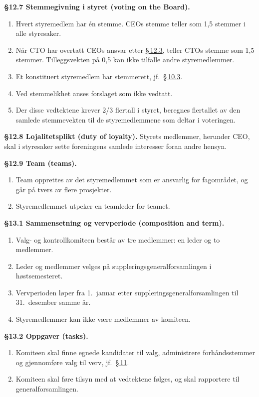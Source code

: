 \documentclass{../../../Common/Latex/Templates/rapport}
\begin{document}
\textbf{\S 12.7 Stemmegivning i styret (voting on the Board).}\label{nbylaw:12.7}
\begin{enumerate}
  \item Hvert styremedlem har \'en stemme. CEOs stemme teller som 1,5 stemmer i alle styresaker.
  \item N\r{a}r CTO har overtatt CEOs ansvar etter \hyperref[nbylaw:12.3]{\S\,12.3}, teller CTOs stemme som 1,5 stemmer. Tilleggsvekten p\r{a} 0,5 kan ikke tilfalle andre styremedlemmer.
  \item Et konstituert styremedlem har stemmerett, jf.\ \hyperref[nbylaw:10.3]{\S\,10.3}.
  \item Ved stemmelikhet anses forslaget som ikke vedtatt.
  \item Der disse vedtektene krever 2/3 flertall i styret, beregnes flertallet av den samlede stemmevekten til de styremedlemmene som deltar i voteringen.
\end{enumerate}

\textbf{\S 12.8 Lojalitetsplikt (duty of loyalty).}\label{nbylaw:12.8} Styrets medlemmer, herunder CEO, skal i styresaker sette foreningens samlede interesser foran andre hensyn.

\textbf{\S 12.9 Team (teams).}\label{nbylaw:12.9}
\begin{enumerate}
  \item Team opprettes av det styremedlemmet som er ansvarlig for fagomr\r{a}det, og g\r{a}r p\r{a} tvers av flere prosjekter.
  \item Styremedlemmet utpeker en teamleder for teamet.
\end{enumerate}

\label{nbylaw:13}
\textbf{\S 13.1 Sammensetning og vervperiode (composition and term).}\label{nbylaw:13.1}
\begin{enumerate}
  \item Valg- og kontrollkomiteen best\r{a}r av tre medlemmer: en leder og to medlemmer.
  \item Leder og medlemmer velges p\r{a} suppleringsgeneralforsamlingen i høstsemesteret.
  \item Vervperioden løper fra 1.\ januar etter suppleringsgeneralforsamlingen til 31.\ desember samme \r{a}r.
  \item Styremedlemmer kan ikke være medlemmer av komiteen.
\end{enumerate}

\textbf{\S 13.2 Oppgaver (tasks).}\label{nbylaw:13.2}
\begin{enumerate}
  \item Komiteen skal finne egnede kandidater til valg, administrere forh\r{a}ndsstemmer og gjennomføre valg til verv, jf.\ \hyperref[nbylaw:11]{\S\,11}.
  \item Komiteen skal føre tilsyn med at vedtektene følges, og skal rapportere til generalforsamlingen.
\end{enumerate}
\end{document}

